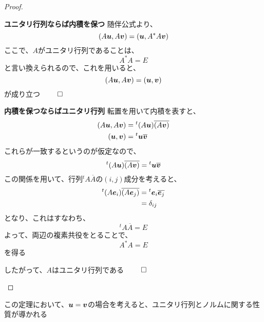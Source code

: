 \documentclass[../../../topic_linear-algebra]{subfiles}
\begin{document}
\begin{proof}
  \begin{subpattern}{\bfseries ユニタリ行列ならば内積を保つ}
    随伴公式より、
    \begin{equation*}
      (A\vb*{u}, A\vb*{v}) = (\vb*{u}, A^*A\vb*{v})
    \end{equation*}
    ここで、$A$がユニタリ行列であることは、
    \begin{equation*}
      A^*A = E
    \end{equation*}
    と言い換えられるので、これを用いると、
    \begin{equation*}
      (A\vb*{u}, A\vb*{v}) = (\vb*{u}, \vb*{v})
    \end{equation*}
    が成り立つ $\qed$
  \end{subpattern}

  \begin{subpattern}{\bfseries 内積を保つならばユニタリ行列}
    転置を用いて内積を表すと、
    \begin{align*}
      (A\vb*{u}, A\vb*{v}) & = {}^t(A\vb*{u}) \overline{(A\vb*{v})} \\
      (\vb*{u}, \vb*{v})   & = {}^t\vb*{u} \overline{\vb*{v}}
    \end{align*}
    これらが一致するというのが仮定なので、
    \begin{equation*}
      {}^t(A\vb*{u}) \overline{(A\vb*{v})} = {}^t\vb*{u} \overline{\vb*{v}}
    \end{equation*}
    この関係を用いて、行列${}^tA\overline{A}$の$(i,j)$成分を考えると、
    \begin{align*}
      {}^t(A\vb*{e}_i) \overline{(A\vb*{e}_j)} & = {}^t\vb*{e}_i \overline{\vb*{e}_j} \\
                                               & = \delta_{ij}
    \end{align*}
    となり、これはすなわち、
    \begin{equation*}
      {}^tA\overline{A} = E
    \end{equation*}
    よって、両辺の複素共役をとることで、
    \begin{equation*}
      A^*A = E
    \end{equation*}
    を得る

    したがって、$A$はユニタリ行列である $\qed$
  \end{subpattern}
\end{proof}

\br

この定理において、$\vb*{u} =  \vb*{v}$の場合を考えると、ユニタリ行列とノルムに関する性質が導かれる
\end{document}

